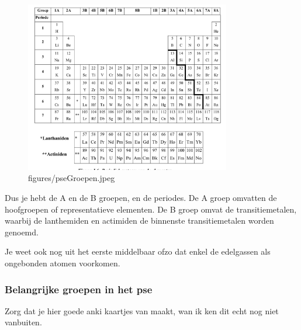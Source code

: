\documentclass{report}
\begin{document}
\begin{figure}[htpb]
	\centering
	\includegraphics[width=0.8\textwidth]{figures/pseGroepen.jpeg}
	\caption{figures/pseGroepen.jpeg}
	\label{fig:-figures-pseGroepen-jpeg}
\end{figure}
 Dus je hebt de A en de B groepen, en de periodes. De A groep omvatten de hoofgroepen of representatieve elementen. De B groep omvat de transitiemetalen, waarbij de lanthemiden en actimiden de binnenste transitiemetalen worden genoemd.


 Je weet ook nog uit het eerste middelbaar ofzo dat enkel de edelgassen als ongebonden atomen voorkomen.

 \subsubsection{Belangrijke groepen in het pse}%
 \label{ssub:Belangrijke groepen in het pse}
 Zorg dat je hier goede anki kaartjes van maakt, wan ik ken dit echt nog niet vanbuiten.
\end{document}
